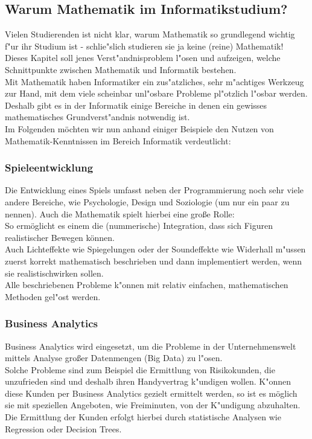 \subsection{Warum Mathematik im Informatikstudium?}
Vielen Studierenden ist nicht klar, warum Mathematik so grundlegend wichtig f"ur ihr Studium ist - schlie"slich studieren sie ja keine (reine) Mathematik! Dieses Kapitel soll jenes Verst"andnisproblem l"osen und aufzeigen, welche Schnittpunkte zwischen Mathematik und Informatik bestehen.\\
Mit Mathematik haben Informatiker ein zus"atzliches, sehr m"achtiges Werkzeug zur Hand, mit dem viele scheinbar unl"osbare Probleme pl"otzlich l"osbar werden.
Deshalb gibt es in der Informatik einige Bereiche in denen ein gewisses mathematisches Grundverst"andnis notwendig ist.\\
Im Folgenden möchten wir nun anhand einiger Beispiele den Nutzen von Mathematik-Kenntnissen im Bereich Informatik verdeutlicht:

\subsubsection{Spieleentwicklung}
Die Entwicklung eines Spiels umfasst neben der Programmierung noch sehr viele andere Bereiche, wie Psychologie, Design und Soziologie (um nur ein paar zu nennen). Auch die Mathematik spielt hierbei eine gro\ss e Rolle:\\
So ermöglicht es einem die (nummerische) Integration, dass sich Figuren realistischer Bewegen können.\\
Auch Lichteffekte wie Spiegelungen oder der Soundeffekte wie Widerhall m"ussen zuerst korrekt mathematisch beschrieben und dann implementiert werden, wenn sie \glqq realistisch\grqq wirken sollen.\\
Alle beschriebenen Probleme k"onnen mit relativ einfachen, mathematischen Methoden gel"ost werden.

\subsubsection{Business Analytics}
Business Analytics wird eingesetzt, um die Probleme in der Unternehmenswelt mittels Analyse gro\ss er Datenmengen (Big Data) zu l"osen.\\
Solche Probleme sind zum Beispiel die Ermittlung von \glqq Risikokunden\grqq, die unzufrieden sind und deshalb ihren Handyvertrag k"undigen wollen. 
K"onnen diese Kunden per Business Analytics gezielt ermittelt werden, so ist es möglich sie mit speziellen Angeboten, wie Freiminuten, von der K"undigung abzuhalten.\\
Die Ermittlung der Kunden erfolgt hierbei durch statistische Analysen wie Regression oder Decision Trees.

